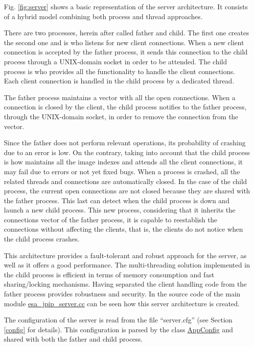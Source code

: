Fig. \ref{fig:server} shows a basic representation of the server architecture. It
consists of a hybrid model combining both process and thread approaches.

There are two processes, herein after called father and child. The first one
creates the second one and is who listens for new client connections. When
a new client connection is accepted by the father process, it sends this
connection to the child process through a UNIX-domain socket in order
to be attended. The child process is who provides all the functionality
to handle the client connections. Each client connection is handled
in the child process by a dedicated thread.

The father process maintains a vector with all the open connections. When
a connection is closed by the client, the child process notifies to the
father process, through the UNIX-domain socket, in order to remove the 
connection from the vector. 

Since the father does not perform relevant operations, its probability of
crashing due to an error is low. On the contrary, taking into account
that the child process is how maintains all the image indexes and attends
all the client connections, it may fail due to errors or not yet fixed
bugs. When a process is crashed, all the related threads and connections
are automatically closed. In the case of the child process, the current
open connections are not closed because they are shared with the father
process. This last can detect when the child process is down and launch
a new child process. This new process, considering that it inherits the
connections vector of the father process, it is capable to reestablish the
connections without affecting the clients, that is, the clients do not
notice when the child process crashes. 

This architecture provides a 
fault-tolerant and robust approach for the server, as well as it 
offers a good performance. The multi-threading solution
implemented in the child process is efficient in terms of memory 
consumption and fast sharing/locking mechanisms. Having separated
the client handling code from the father process provides 
robustness and security. In the source code of the main module
\hyperlink{esa__jpip__server_8cc}{esa\_jpip\_server.cc} can be
seen how this server architecture is created.

The configuration of the server is read from the file ``server.cfg''
(see Section \ref{config} for details). This configuration is parsed
by the class \hyperlink{classAppConfig}{AppConfig} and shared with both
the father and child process.

